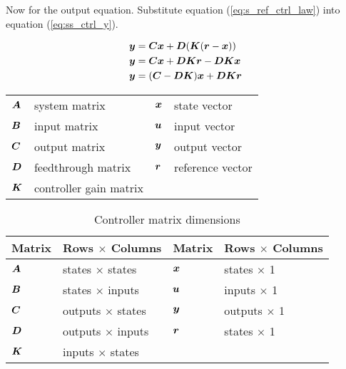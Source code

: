 Now for the output equation. Substitute equation (\ref{eq:s_ref_ctrl_law}) into
equation (\ref{eq:ss_ctrl_y}).

\begin{align}
  \mtx{y} &= \mtx{C}\mtx{x} + \mtx{D}(\mtx{K}(\mtx{r} - \mtx{x})) \nonumber \\
  \mtx{y} &= \mtx{C}\mtx{x} + \mtx{D}\mtx{K}\mtx{r} - \mtx{D}\mtx{K}\mtx{x}
    \nonumber \\
  \mtx{y} &= (\mtx{C} - \mtx{D}\mtx{K})\mtx{x} + \mtx{D}\mtx{K}\mtx{r}
    \label{eq:s_ref_ctrl_y}
\end{align}

\begin{table}[ht]
  \renewcommand{\arraystretch}{1.3}
  \centering
  \begin{tabulary}{\linewidth}{LLLL}
    $\bm A$ & system matrix      & $\bm x$ & state vector \\
    $\bm B$ & input matrix       & $\bm u$ & input vector \\
    $\bm C$ & output matrix      & $\bm y$ & output vector \\
    $\bm D$ & feedthrough matrix & $\bm r$ & \gls{reference} vector \\
    $\bm K$ & controller gain matrix &  &  \\
  \end{tabulary}
  \label{tab:ctrl_def}
\end{table}

\begin{table}[ht]
  \caption{Controller matrix dimensions}
  \renewcommand{\arraystretch}{1.5}
  \centering
  \begin{tabular}{|ll|ll|}
    \hline
    \rowcolor{lightblue}
    \textbf{Matrix} & \textbf{Rows $\times$ Columns} &
    \textbf{Matrix} & \textbf{Rows $\times$ Columns} \\
    \hline
    $\bm A$ & states $\times$ states & $\bm x$ & states $\times$ 1 \\
    $\bm B$ & states $\times$ inputs & $\bm u$ & inputs $\times$ 1 \\
    $\bm C$ & outputs $\times$ states & $\bm y$ & outputs $\times$ 1 \\
    $\bm D$ & outputs $\times$ inputs & $\bm r$ & states $\times$ 1 \\
    $\bm K$ & inputs $\times$ states &  &  \\
    \hline
  \end{tabular}
  \label{tab:ctrl_matrix_dims}
\end{table}

